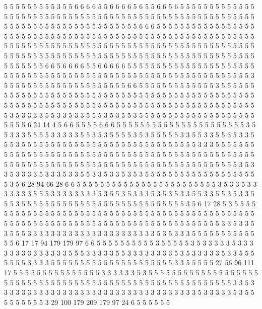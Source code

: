 5 5 5 5 5 5 5 5 5 3 5 5 6 6 6 6 5 5 6 6
6 6 5 6 5 5 6 6 5 6 5 5 5 5 5 5 5 5 5 5
5 5 5 5 5 5 5 5 5 5 5 5 5 5 5 5 5 5 5 5
5 5 5 5 5 5 5 5 5 5 5 5 5 5 5 5 5 5 5 5
5 5 5 5 5 5 5 5 5 5 5 5 5 5 5 5 5 5 5 5
5 5 5 5 5 5 5 5 5 6 6 6 5 5 5 5 5 5 5 5
5 5 5 5 5 5 5 5 5 5 5 5 5 5 5 5 5 5 5 5
5 5 5 5 5 5 5 5 5 5 5 5 5 5 5 5 5 5 5 5
5 5 5 5 5 5 5 5 5 5 5 5 5 5 5 5 5 5 5 5
5 5 5 5 5 5 5 5 5 5 5 5 5 5 5 5 5 5 5 5
5 5 5 5 5 5 5 5 5 5 5 5 5 5 5 5 5 5 5 5
5 5 5 5 5 5 5 5 5 5 5 5 5 5 5 5 5 5 5 5
5 5 5 5 5 5 5 5 5 5 5 5 5 5 5 5 5 5 5 5
5 5 5 5 5 6 6 5 6 6 6 6 5 5 6 6 6 6 6 5
5 5 5 5 5 5 5 5 5 5 5 5 5 5 5 5 5 5 5 5
5 5 5 5 5 5 5 5 5 5 5 5 5 5 5 5 5 5 5 5
5 5 5 5 5 5 5 5 5 5 5 5 5 5 5 5 5 5 5 5
5 5 5 3 5 5 5 5 5 5 5 5 5 5 5 5 5 5 5 5
5 5 5 5 5 6 6 5 5 5 5 5 5 5 5 5 5 5 5 5
3 5 5 5 5 5 5 5 5 5 5 5 5 5 5 5 5 5 5 5
5 5 5 5 5 5 5 5 5 5 5 5 5 5 5 5 5 5 5 5
5 5 5 5 5 5 5 5 5 5 5 5 5 5 5 5 5 5 5 5
5 5 5 5 5 5 5 5 5 5 5 5 5 5 5 5 5 5 5 5
5 5 5 5 5 5 5 5 5 5 5 5 5 5 3 5 3 3 3 3
5 5 3 3 5 3 3 5 5 5 3 5 3 5 5 3 5 5 5 5
5 5 5 5 5 5 5 5 5 5 5 5 5 5 5 5 5 5 5 5
6 24 14 4 5 6 6 5 5 5 5 6 6 6 5 5 5 5 5 5
5 5 5 5 5 5 5 5 5 5 5 5 5 5 5 5 3 5 5 3
3 3 5 5 5 5 3 3 3 3 3 5 5 3 5 3 5 5 5 5
3 5 3 5 5 5 5 5 3 3 5 5 3 3 5 5 3 5 3 3
5 5 5 3 5 5 5 5 5 5 5 5 5 5 5 5 5 5 5 5
5 5 5 5 5 5 5 5 5 5 5 5 5 5 3 3 3 5 5 5
5 5 5 5 5 5 5 5 5 5 5 5 5 5 5 5 5 5 5 5
5 5 5 5 5 5 5 5 5 5 5 5 5 5 5 5 5 5 5 5
5 5 5 5 5 5 5 5 5 5 5 5 5 5 5 5 5 5 5 5
5 5 5 5 5 5 5 5 5 5 5 5 5 5 5 5 5 5 5 5
5 5 5 5 5 5 5 3 5 3 3 5 3 3 3 3 5 3 3 3
5 3 3 5 5 3 3 5 3 3 5 3 5 3 5 5 5 5 5 5
5 5 5 5 5 5 5 5 5 5 5 5 5 5 3 5 6 28 94 66
28 6 6 5 5 5 5 5 5 5 5 5 5 5 5 5 5 5 5 5
5 5 5 5 5 5 5 3 5 3 3 5 3 3 3 3 3 3 3 5
5 5 3 3 3 3 3 3 3 3 5 3 5 5 3 5 3 3 3 5
3 5 3 5 3 3 5 5 3 3 5 5 3 5 3 3 5 5 5 3
5 5 5 5 5 5 5 5 5 5 5 5 5 5 5 5 5 5 5 5
5 5 5 5 5 5 5 5 3 5 6 17 28 5 3 5 5 5 5 5
5 5 5 5 5 5 5 5 5 5 5 5 5 5 5 5 5 5 5 5
5 5 5 5 5 5 5 5 5 5 5 5 5 5 5 5 5 5 5 5
5 5 5 5 5 5 5 5 5 5 5 5 5 5 5 5 5 5 5 5
5 5 5 5 5 5 5 5 5 5 5 5 5 5 5 5 5 5 5 3
3 5 3 3 5 3 5 5 5 3 3 3 3 3 3 3 3 3 3 3
3 3 3 3 3 3 3 3 3 3 3 5 3 5 3 3 3 5 5 5
5 5 5 5 5 5 5 5 5 5 6 17 17 94 179 179 97 6 6 5
5 5 5 5 5 5 5 5 5 3 5 5 5 5 5 3 5 3 3 3
3 3 5 3 3 3 3 3 3 3 3 3 3 3 3 3 3 5 5 5
3 3 3 3 3 5 5 3 3 3 3 3 3 3 3 5 3 5 3 3
3 3 3 5 3 3 5 5 5 5 5 5 5 3 3 3 3 5 5 5
5 5 5 5 5 5 5 5 5 5 5 5 5 5 5 5 5 5 3 3
5 5 5 5 5 27 56 96 111 17 5 5 5 5 5 5 5 5 5 5
5 5 5 5 5 3 3 3 3 3 3 5 3 5 5 5 5 5 5 5
5 5 5 5 5 5 5 5 5 5 5 5 5 5 5 5 5 5 5 5
5 5 5 5 5 5 5 5 5 5 5 5 5 5 5 5 5 5 5 5
5 5 5 5 5 5 5 5 5 5 5 3 3 5 3 3 3 3 3 3
3 3 3 3 3 3 3 3 3 3 3 3 3 3 3 3 3 3 3 3
3 3 3 3 3 3 3 3 5 3 3 3 3 3 5 3 5 5 5 5
5 5 5 5 5 3 29 100 179 209 179 97 24 6 5 5 5 5 5 5
